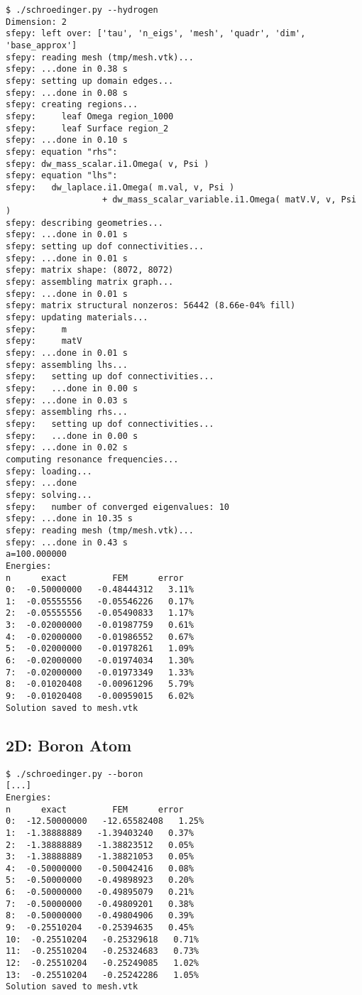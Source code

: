 \begin{lstlisting}
$ ./schroedinger.py --hydrogen
Dimension: 2
sfepy: left over: ['tau', 'n_eigs', 'mesh', 'quadr', 'dim', 'base_approx']
sfepy: reading mesh (tmp/mesh.vtk)...
sfepy: ...done in 0.38 s
sfepy: setting up domain edges...
sfepy: ...done in 0.08 s
sfepy: creating regions...
sfepy:     leaf Omega region_1000
sfepy:     leaf Surface region_2
sfepy: ...done in 0.10 s
sfepy: equation "rhs":
sfepy: dw_mass_scalar.i1.Omega( v, Psi )
sfepy: equation "lhs":
sfepy:   dw_laplace.i1.Omega( m.val, v, Psi )
                   + dw_mass_scalar_variable.i1.Omega( matV.V, v, Psi )
sfepy: describing geometries...
sfepy: ...done in 0.01 s
sfepy: setting up dof connectivities...
sfepy: ...done in 0.01 s
sfepy: matrix shape: (8072, 8072)
sfepy: assembling matrix graph...
sfepy: ...done in 0.01 s
sfepy: matrix structural nonzeros: 56442 (8.66e-04% fill)
sfepy: updating materials...
sfepy:     m
sfepy:     matV
sfepy: ...done in 0.01 s
sfepy: assembling lhs...
sfepy:   setting up dof connectivities...
sfepy:   ...done in 0.00 s
sfepy: ...done in 0.03 s
sfepy: assembling rhs...
sfepy:   setting up dof connectivities...
sfepy:   ...done in 0.00 s
sfepy: ...done in 0.02 s
computing resonance frequencies...
sfepy: loading...
sfepy: ...done
sfepy: solving...
sfepy:   number of converged eigenvalues: 10
sfepy: ...done in 10.35 s
sfepy: reading mesh (tmp/mesh.vtk)...
sfepy: ...done in 0.43 s
a=100.000000
Energies:
n      exact         FEM      error
0:  -0.50000000   -0.48444312   3.11%
1:  -0.05555556   -0.05546226   0.17%
2:  -0.05555556   -0.05490833   1.17%
3:  -0.02000000   -0.01987759   0.61%
4:  -0.02000000   -0.01986552   0.67%
5:  -0.02000000   -0.01978261   1.09%
6:  -0.02000000   -0.01974034   1.30%
7:  -0.02000000   -0.01973349   1.33%
8:  -0.01020408   -0.00961296   5.79%
9:  -0.01020408   -0.00959015   6.02%
Solution saved to mesh.vtk
\end{lstlisting}

\subsection{2D: Boron Atom}

\begin{lstlisting}
$ ./schroedinger.py --boron
[...]
Energies:
n      exact         FEM      error
0:  -12.50000000   -12.65582408   1.25%
1:  -1.38888889   -1.39403240   0.37%
2:  -1.38888889   -1.38823512   0.05%
3:  -1.38888889   -1.38821053   0.05%
4:  -0.50000000   -0.50042416   0.08%
5:  -0.50000000   -0.49898923   0.20%
6:  -0.50000000   -0.49895079   0.21%
7:  -0.50000000   -0.49809201   0.38%
8:  -0.50000000   -0.49804906   0.39%
9:  -0.25510204   -0.25394635   0.45%
10:  -0.25510204   -0.25329618   0.71%
11:  -0.25510204   -0.25324683   0.73%
12:  -0.25510204   -0.25249085   1.02%
13:  -0.25510204   -0.25242286   1.05%
Solution saved to mesh.vtk
\end{lstlisting}

